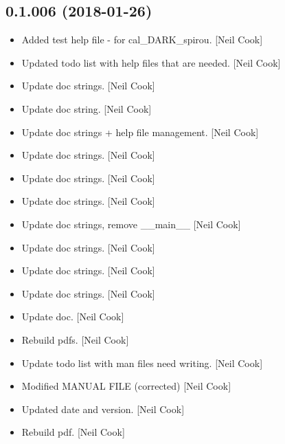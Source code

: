 \documentclass[a4paper,10pt,english]{report}
\begin{document}
\subsection{0.1.006 (2018-01-26)}
\label{\detokenize{misc/changelog:id496}}\begin{itemize}
\item {} 
Added test help file - for cal\_DARK\_spirou. {[}Neil Cook{]}

\item {} 
Updated todo list with help files that are needed. {[}Neil Cook{]}

\item {} 
Update doc strings. {[}Neil Cook{]}

\item {} 
Update doc string. {[}Neil Cook{]}

\item {} 
Update doc strings + help file management. {[}Neil Cook{]}

\item {} 
Update doc strings. {[}Neil Cook{]}

\item {} 
Update doc strings. {[}Neil Cook{]}

\item {} 
Update doc strings. {[}Neil Cook{]}

\item {} 
Update doc strings, remove \_\_main\_\_ {[}Neil Cook{]}

\item {} 
Update doc strings. {[}Neil Cook{]}

\item {} 
Update doc strings. {[}Neil Cook{]}

\item {} 
Update doc strings. {[}Neil Cook{]}

\item {} 
Update doc. {[}Neil Cook{]}

\item {} 
Rebuild pdfs. {[}Neil Cook{]}

\item {} 
Update todo list with man files need writing. {[}Neil Cook{]}

\item {} 
Modified MANUAL FILE (corrected) {[}Neil Cook{]}

\item {} 
Updated date and version. {[}Neil Cook{]}

\item {} 
Rebuild pdf. {[}Neil Cook{]}


\end{itemize}
\end{document}
